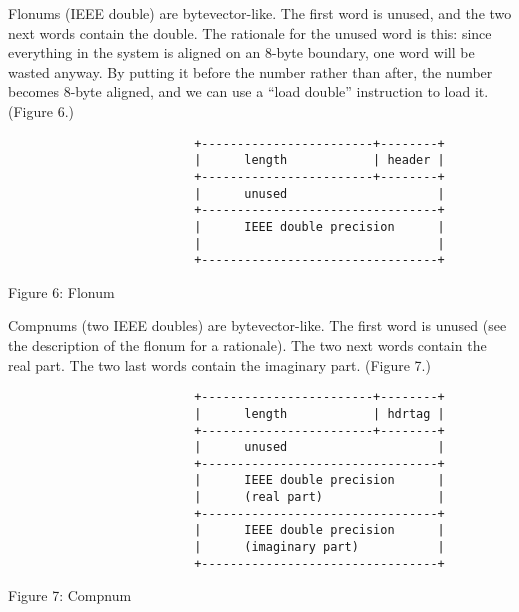 Flonums (IEEE double) are bytevector-like. The first word is unused,
and the two next words contain the double. The rationale for the unused
word is this: since everything in the system is aligned on an 8-byte
boundary, one word will be wasted anyway. By putting it before the
number rather than after, the number becomes 8-byte aligned, and we can use
a ``load double'' instruction to load it. (Figure 6.)

\begin{minipage}{\linewidth}
\begin{verbatim}
                          +------------------------+--------+
                          |      length            | header |
                          +------------------------+--------+
                          |      unused                     |
                          +---------------------------------+
                          |      IEEE double precision      |
                          |                                 |
                          +---------------------------------+
\end{verbatim}
\centerline{Figure 6: Flonum}
\end{minipage}

Compnums (two IEEE doubles) are bytevector-like. The first word is
unused (see the description of the flonum for a rationale).  The two
next words contain the real part. The two last words contain the
imaginary part. (Figure 7.)

\begin{minipage}{\linewidth}
\begin{verbatim}
                          +------------------------+--------+
                          |      length            | hdrtag |
                          +------------------------+--------+
                          |      unused                     |
                          +---------------------------------+
                          |      IEEE double precision      |
                          |      (real part)                |
                          +---------------------------------+
                          |      IEEE double precision      |
                          |      (imaginary part)           |
                          +---------------------------------+
\end{verbatim}
\centerline{Figure 7: Compnum}
\end{minipage}


